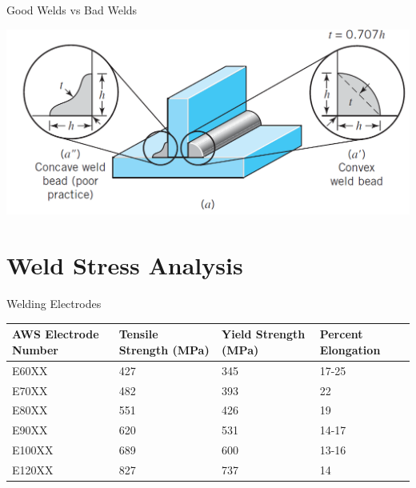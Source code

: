 \documentclass[10pt, svgnames]{beamer}
\begin{document}
\begin{frame}[label={sec:org2c2b5d5}]{Good Welds vs Bad Welds}
\begin{center}
\includegraphics[width=.9\linewidth]{./pictures/good-bead-vs-bad-bead.png}
\end{center}
\end{frame}

\section{Weld Stress Analysis}
\label{sec:orgb3b582b}
\begin{frame}[label={sec:org98c57bf}]{Welding Electrodes}
\centering 
\begin{tabular}{ p{3cm} p{2cm} p{2cm} p{2cm} }
  \toprule
  AWS Electrode Number & Tensile Strength (MPa) & Yield Strength (MPa) & Percent Elongation \\
  \midrule
  E60XX & 427 & 345 & 17-25 \\
  E70XX & 482 & 393 & 22 \\
  E80XX & 551 & 426 & 19 \\
  E90XX & 620 & 531 & 14-17 \\
  E100XX & 689 & 600 & 13-16 \\
  E120XX & 827 & 737 & 14 \\
  \bottomrule
\end{tabular}
\end{frame}
\end{document}
